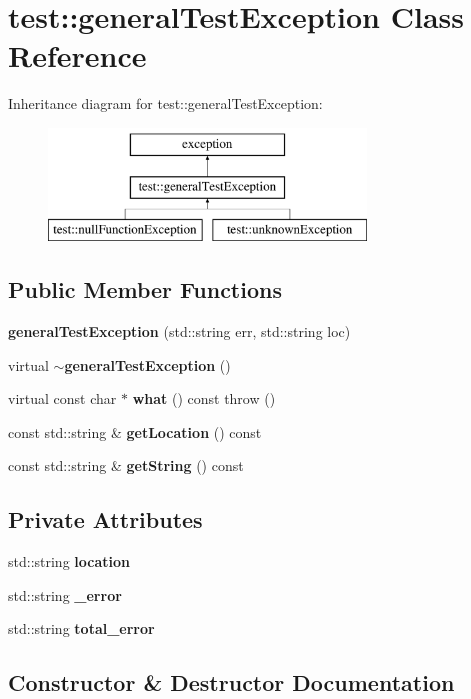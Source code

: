 \section{test\+:\+:general\+Test\+Exception Class Reference}
\label{classtest_1_1generalTestException}
Inheritance diagram for test\+:\+:general\+Test\+Exception\+:\begin{figure}[H]
\begin{center}
\leavevmode
\includegraphics[height=3.000000cm]{classtest_1_1generalTestException}
\end{center}
\end{figure}
\subsection*{Public Member Functions}
\begin{DoxyCompactItemize}
\item 
{\bf general\+Test\+Exception} (std\+::string err, std\+::string loc)
\item 
virtual {\bf $\sim$general\+Test\+Exception} ()
\item 
virtual const char $\ast$ {\bf what} () const   throw ()
\item 
const std\+::string \& {\bf get\+Location} () const 
\item 
const std\+::string \& {\bf get\+String} () const 
\end{DoxyCompactItemize}
\subsection*{Private Attributes}
\begin{DoxyCompactItemize}
\item 
std\+::string {\bf location}
\item 
std\+::string {\bf \+\_\+error}
\item 
std\+::string {\bf total\+\_\+error}
\end{DoxyCompactItemize}


\subsection{Constructor \& Destructor Documentation}
